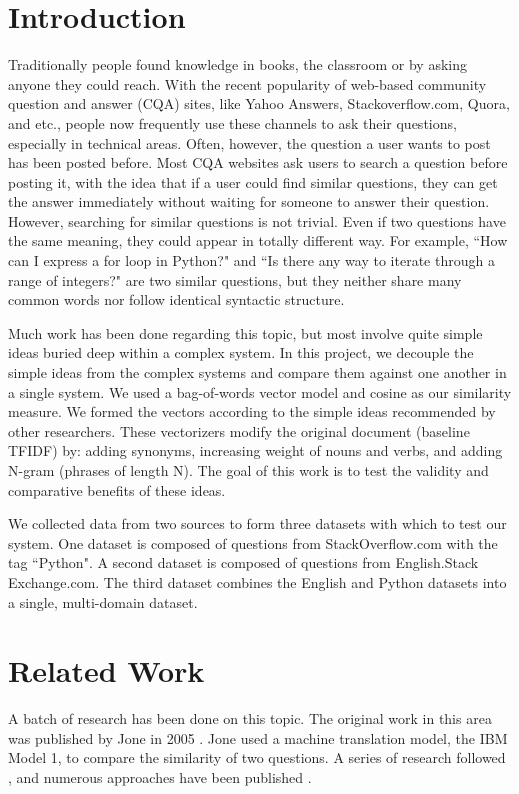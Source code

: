 \documentclass{acm_proc_article-sp}
\begin{document}


\section{Introduction}
Traditionally people found knowledge in books, the classroom or by asking anyone they could reach. With the recent popularity of web-based community question and answer (CQA) sites, like Yahoo Answers, Stackoverflow.com, Quora, and etc., people now frequently use these channels to ask their questions, especially in technical areas. Often, however, the question a user wants to post has been posted before. Most CQA websites ask users to search a question before posting it, with the idea that if a user could find similar questions, they can get the answer immediately without waiting for someone to answer their question. However, searching for similar questions is not trivial. Even if two questions have the same meaning, they could appear in totally different way.  For example, ``How can I express a for loop in Python?" and ``Is there any way to iterate through a range of integers?" are two similar questions, but they neither share many common words nor follow identical syntactic structure. 

Much work has been done regarding this topic, but most involve quite simple ideas buried deep within a complex system. In this project, we decouple the simple ideas from the complex systems and compare them against one another in a single system. We used a bag-of-words vector model and cosine as our similarity measure. We formed the vectors according to the simple ideas recommended by other researchers. These vectorizers modify the original document (baseline TFIDF) by: adding synonyms, increasing weight of nouns and verbs, and adding N-gram (phrases of length N). The goal of this work is to test the validity and comparative benefits of these ideas.

We collected data from two sources to form three datasets with which to test our system. One dataset is composed of questions from StackOverflow.com with the tag ``Python". A second dataset is composed of questions from English.Stack
Exchange.com. 
The third dataset combines the English and Python datasets into a single, multi-domain dataset.


\section{Related Work}
A batch of research has been done on this topic. The original work in this area was published by  Jone in 2005 \cite{jeon2005finding}. Jone used a machine translation model, the IBM Model 1, to compare the similarity of two questions.  A series of research followed , and numerous approaches have been published \cite{cao2009use, jijkoun2005retrieving, wang2009syntactic, millar2006performance, liu2009searching}. %
\end{document}
